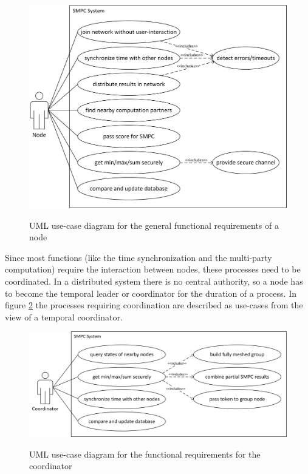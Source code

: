 	\begin{figure}[!htb] %
	\caption{\gls{UML} use-case diagram for the general functional requirements of a node}
	\includegraphics[scale=0.85]{figures/use-case-node.png}
	\label{figure:requirements use-case node}
	\end{figure}

	Since most functions (like the time synchronization and the multi-party computation) require the interaction between nodes, these processes need to be coordinated. In a distributed system there is no central authority, so a node has to become the temporal leader or coordinator for the duration of a process. In figure \ref{figure:requirements use-case coordinator} the processes requiring coordination are described as use-cases from the view of a temporal coordinator.
	
	\begin{figure}[!htb] %
	\caption{\gls{UML} use-case diagram for the functional requirements for the coordinator}
	\includegraphics[scale=0.75]{figures/use-case-coordinator.png}
	\label{figure:requirements use-case coordinator}
	\end{figure}

